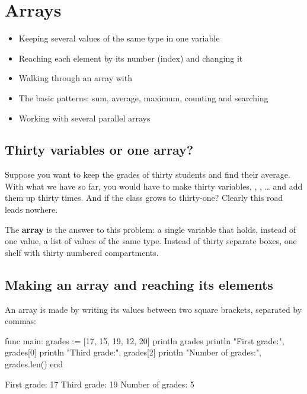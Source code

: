 \chapter{Arrays}\label{ch:arrays}

\begin{goals}
\begin{itemize}
  \item Keeping several values of the same type in one variable
  \item Reaching each element by its number (index) and changing it
  \item Walking through an array with 
  \item The basic patterns: sum, average, maximum, counting and searching
  \item Working with several parallel arrays
\end{itemize}
\end{goals}

\section{Thirty variables or one array?}

Suppose you want to keep the grades of thirty students and find their
average. With what we have so far, you would have to make thirty variables,
, , \ldots{} and add them up thirty times. And if
the class grows to thirty-one? Clearly this road leads nowhere.

The \textbf{array} is the answer to this problem: a single variable that
holds, instead of one value, a list of values of the same type. Instead of
thirty separate boxes, one shelf with thirty numbered compartments.

\section{Making an array and reaching its elements}

An array is made by writing its values between two square brackets,
separated by commas:

\begin{salamcode}
func main:
    grades := [17, 15, 19, 12, 20]
    println grades
    println "First grade:", grades[0]
    println "Third grade:", grades[2]
    println "Number of grades:", grades.len()
end
\end{salamcode}

\begin{salamout}
[17, 15, 19, 12, 20]
First grade: 17
Third grade: 19
Number of grades: 5
\end{salamout}

